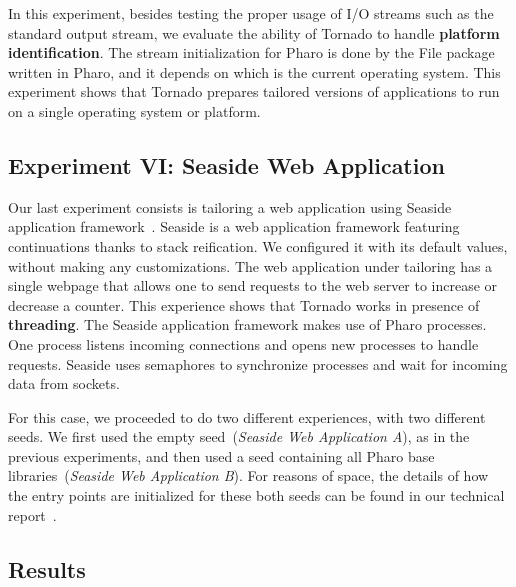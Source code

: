 In this experiment, besides testing the proper usage of I/O streams such as the standard output stream, we evaluate the ability of Tornado to handle \textbf{platform identification}. The  stream initialization for Pharo is done by the File package written in Pharo, and it depends on which is the current operating system. This experiment shows that Tornado prepares tailored versions of applications to run on a single operating system or platform.

\subsection{Experiment VI: Seaside Web Application}



Our last experiment consists is tailoring a web application using Seaside application framework~\cite{Duca07a}. Seaside is a web application framework featuring continuations thanks to stack reification. We configured it with its default values, without making any customizations. The web application under tailoring has a single webpage that allows one to send requests to the web server to increase or decrease a counter. This experience shows that Tornado works in presence of \textbf{threading}. The Seaside application framework makes use of Pharo processes. One process listens incoming connections and opens new processes to handle requests. Seaside uses semaphores to synchronize processes and wait for incoming data from sockets.

For this case, we proceeded to do two different experiences, with two different seeds. We first used the empty seed~(\emph{Seaside Web Application A}), as in the previous experiments, and then used a seed containing all Pharo base libraries~(\emph{Seaside Web Application B}). For reasons of space, the details of how the entry points are initialized for these both seeds can be found in our technical report~\cite{Poli14a}.

\subsection{Results} \label{sec:results_discussion}

